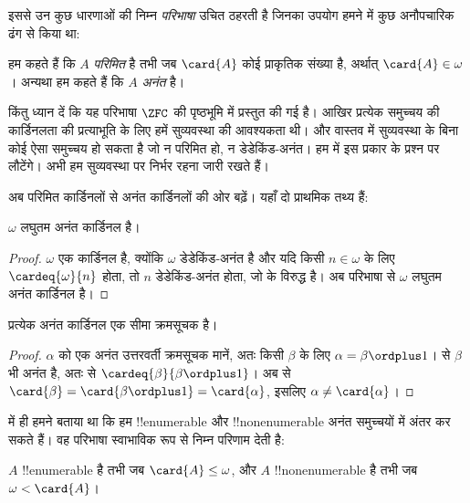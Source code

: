 \documentclass[../../../include/open-logic-section]{subfiles}
\begin{document}
इससे उन कुछ धारणाओं की निम्न \emph{परिभाषा} उचित ठहरती है जिनका उपयोग हमने
 में कुछ अनौपचारिक ढंग से किया था:

\begin{defn}
हम कहते हैं कि $A$ \emph{परिमित} है तभी जब $\card{A}$ कोई प्राकृतिक
संख्या है, अर्थात् $\card{A}\in\omega$। अन्यथा हम कहते हैं कि $A$
\emph{अनंत} है।
\end{defn}
\noindent 
किंतु ध्यान दें कि यह परिभाषा $\ZFC$ की पृष्ठभूमि में प्रस्तुत की गई है।
आखिर प्रत्येक समुच्चय की कार्डिनलता की प्रत्याभूति के लिए हमें सुव्यवस्था
की आवश्यकता थी। और वास्तव में सुव्यवस्था के बिना कोई ऐसा समुच्चय हो सकता
है जो न परिमित हो, न डेडेकिंड-अनंत। हम  में इस प्रकार
के प्रश्न पर लौटेंगे। अभी हम सुव्यवस्था पर निर्भर रहना जारी रखते हैं।

अब परिमित कार्डिनलों से अनंत कार्डिनलों की ओर बढ़ें। यहाँ दो प्राथमिक तथ्य
हैं:

\begin{cor}
$\omega$ लघुतम अनंत कार्डिनल है।
\end{cor}

\begin{proof}
$\omega$ एक कार्डिनल है, क्योंकि $\omega$ डेडेकिंड-अनंत है और यदि किसी
$n\in\omega$ के लिए $\cardeq{\omega}{n}$ होता, तो $n$ डेडेकिंड-अनंत होता,
जो  के विरुद्ध है।
अब परिभाषा से $\omega$ लघुतम अनंत कार्डिनल है।
\end{proof}

\begin{cor}
प्रत्येक अनंत कार्डिनल एक सीमा क्रमसूचक है।
\end{cor}

\begin{proof}
$\alpha$ को एक अनंत उत्तरवर्ती क्रमसूचक मानें, अतः किसी $\beta$ के लिए
$\alpha=\beta\ordplus 1$।  से $\beta$ भी अनंत
है, अतः  से
$\cardeq{\beta}{\beta\ordplus 1}$। अब
 से
$\card{\beta}=\card{\beta\ordplus 1}=\card{\alpha}$, इसलिए
$\alpha\neq\card{\alpha}$।
\end{proof}

 में ही हमने बताया था कि हम
!!{enumerable} और !!{nonenumerable} अनंत समुच्चयों में अंतर कर सकते हैं।
वह परिभाषा स्वाभाविक रूप से निम्न परिणाम देती है:

\begin{prop}
$A$ !!{enumerable} है तभी जब $\card{A}\leq\omega$, और $A$
!!{nonenumerable} है तभी जब $\omega<\card{A}$।
\end{prop}
\end{document}
